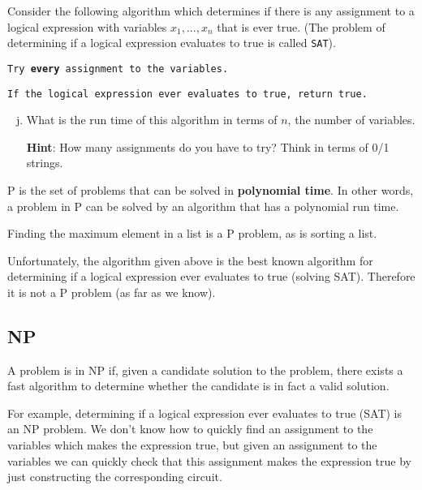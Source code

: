 \documentclass[12pt,letterpaper]{article}
\newcommand\hint[1]{\textbf{Hint}: #1}
\begin{document}
	Consider the following algorithm which determines if there is any assignment to a logical expression with variables $x_1,...,x_n$ that is ever true. (The problem of determining if a logical expression evaluates to true is called \texttt{SAT}).
	
	\texttt{Try \textbf{every} assignment to the variables.}

	\texttt{If the logical expression ever evaluates to true, return true.}

	\begin{enumerate}[a.]
		\setcounter{enumi}{9}
		\item What is the run time of this algorithm in terms of $n$, the number of variables. 

		\hint How many assignments do you have to try? Think in terms of 0/1 strings.
		\begin{mdframed}
		\vspace{3cm}
		\end{mdframed}
	\end{enumerate}

	P is the set of problems that can be solved in \textbf{polynomial time}. In other words, a problem in P can be solved by an algorithm that has a polynomial run time.

	Finding the maximum element in a list is a P problem, as is sorting a list.

	Unfortunately, the algorithm given above is the best known algorithm for determining if a logical expression ever evaluates to true (solving SAT). Therefore it is not a P problem (as far as we know).

	\subsection*{NP}
	
A problem is in NP if, given a candidate solution to the problem, there exists a fast algorithm to determine whether the candidate is in fact a valid solution.

	For example, determining if a logical expression ever evaluates to true (SAT) is an NP problem. We don't know how to quickly find an assignment to the variables which makes the expression true, but given an assignment to the variables we can quickly check that this assignment makes the expression true by just constructing the corresponding circuit. 
\end{document}
